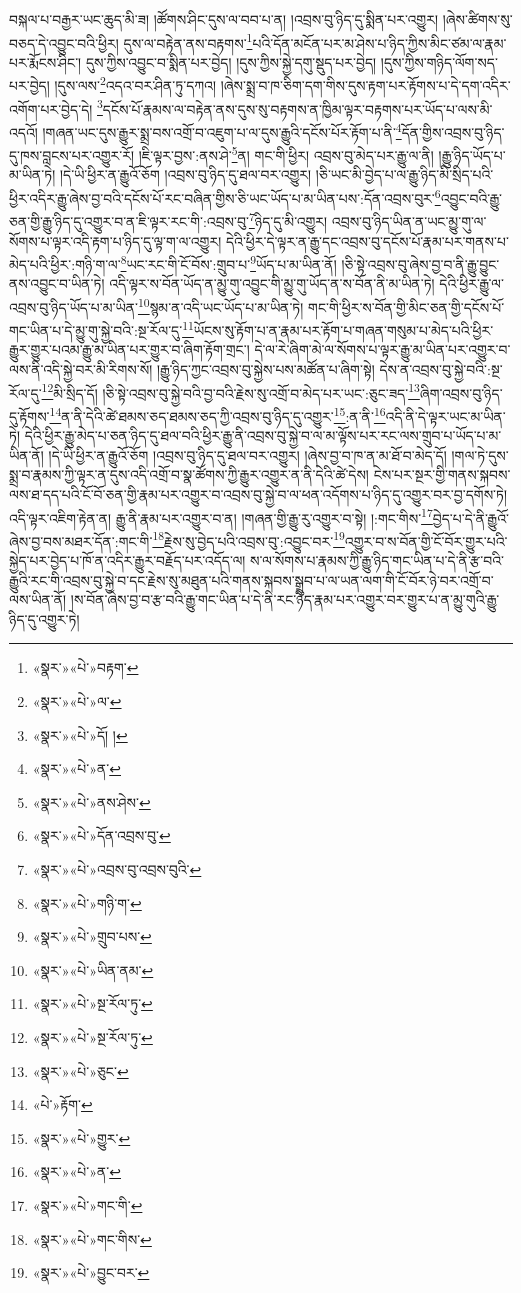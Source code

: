 བསྐལ་པ་བརྒྱར་ཡང་ཆུད་མི་ཟ། །ཚོགས་ཤིང་དུས་ལ་བབ་པ་ན། །འབྲས་བུ་ཉིད་དུ་སྨིན་པར་འགྱུར། །ཞེས་ཚིགས་སུ་བཅད་དེ་འབྱུང་བའི་ཕྱིར། དུས་ལ་བརྟེན་ནས་བརྟགས་\footnote{«སྣར་»«པེ་»བརྟག་}པའི་དོན་མངོན་པར་མ་ཤེས་པ་ཉིད་ཀྱིས་མིང་ཙམ་ལ་རྣམ་པར་རྨོངས་ཤིང་། དུས་ཀྱིས་འབྱུང་བ་སྨིན་པར་བྱེད། །དུས་ཀྱིས་སྐྱེ་དགུ་སྡུད་པར་བྱེད། །དུས་ཀྱིས་གཉིད་ལོག་སད་པར་བྱེད། །དུས་ལས་\footnote{«སྣར་»«པེ་»ལ་}འདའ་བར་ཤིན་ཏུ་དཀའ། །ཞེས་སྨྲ་བ་ཁ་ཅིག་དག་གིས་དུས་རྟག་པར་རྟོགས་པ་དེ་དག་འདིར་འགོག་པར་བྱེད་དེ། \footnote{«སྣར་»«པེ་»དོ། ། }དངོས་པོ་རྣམས་ལ་བརྟེན་ནས་དུས་སུ་བརྟགས་ན་ཁྱིམ་ལྟར་བརྟགས་པར་ཡོད་པ་ལས་མི་འདའོ། །གཞན་ཡང་དུས་རྒྱུར་སྨྲ་བས་འགྲོ་བ་འཇུག་པ་ལ་དུས་རྒྱུའི་དངོས་པོར་རྟོག་པ་ནི་\footnote{«སྣར་»«པེ་»ན་}དོན་གྱིས་འབྲས་བུ་ཉིད་དུ་ཁས་བླངས་པར་འགྱུར་རོ། །ཇི་ལྟར་བྱས་:ནས་ཤེ་\footnote{«སྣར་»«པེ་»ནས་ཤེས་}ན། གང་གི་ཕྱིར། འབྲས་བུ་མེད་པར་རྒྱུ་ལ་ནི། །རྒྱུ་ཉིད་ཡོད་པ་མ་ཡིན་ཏེ། །དེ་ཡི་ཕྱིར་ན་རྒྱུའོ་ཅོག །འབྲས་བུ་ཉིད་དུ་ཐལ་བར་འགྱུར། །ཅི་ཡང་མི་བྱེད་པ་ལ་རྒྱུ་ཉིད་མི་སྲིད་པའི་ཕྱིར་འདིར་རྒྱུ་ཞེས་བྱ་བའི་དངོས་པོ་རང་བཞིན་གྱིས་ཅི་ཡང་ཡོད་པ་མ་ཡིན་པས་:དོན་འབྲས་བུར་\footnote{«སྣར་»«པེ་»དོན་འབྲས་བུ་}འབྱུང་བའི་རྒྱུ་ཅན་གྱི་རྒྱུ་ཉིད་དུ་འགྱུར་བ་ན་ཇི་ལྟར་རང་གི་:འབྲས་བུ་\footnote{«སྣར་»«པེ་»འབྲས་བུ་འབྲས་བུའི་}ཉིད་དུ་མི་འགྱུར། འབྲས་བུ་ཉིད་ཡིན་ན་ཡང་མྱུ་གུ་ལ་སོགས་པ་ལྟར་འདི་རྟག་པ་ཉིད་དུ་ལྟ་ག་ལ་འགྱུར། དེའི་ཕྱིར་དེ་ལྟར་ན་རྒྱུ་དང་འབྲས་བུ་དངོས་པོ་རྣམ་པར་གནས་པ་མེད་པའི་ཕྱིར་:གཉི་ག་ལ་\footnote{«སྣར་»«པེ་»གཉི་ག་}ཡང་རང་གི་ངོ་བོས་:གྲུབ་པ་\footnote{«སྣར་»«པེ་»གྲུབ་པས་}ཡོད་པ་མ་ཡིན་ནོ། །ཅི་སྟེ་འབྲས་བུ་ཞེས་བྱ་བ་ནི་རྒྱུ་བྱུང་ནས་འབྱུང་བ་ཡིན་ཏེ། འདི་ལྟར་ས་བོན་ཡོད་ན་མྱུ་གུ་འབྱུང་གི་མྱུ་གུ་ཡོད་ན་ས་བོན་ནི་མ་ཡིན་ཏེ། དེའི་ཕྱིར་རྒྱུ་ལ་འབྲས་བུ་ཉིད་ཡོད་པ་མ་ཡིན་\footnote{«སྣར་»«པེ་»ཡིན་ནམ་}སྙམ་ན་འདི་ཡང་ཡོད་པ་མ་ཡིན་ཏེ། གང་གི་ཕྱིར་ས་བོན་གྱི་མིང་ཅན་གྱི་དངོས་པོ་གང་ཡིན་པ་དེ་མྱུ་གུ་སྐྱེ་བའི་:སྔ་རོལ་དུ་\footnote{«སྣར་»«པེ་»སྔ་རོལ་ཏུ་}ཡོངས་སུ་རྟོག་པ་ན་རྣམ་པར་རྟོག་པ་གཞན་གསུམ་པ་མེད་པའི་ཕྱིར་རྒྱུར་གྱུར་པའམ་རྒྱུ་མ་ཡིན་པར་གྱུར་བ་ཞིག་རྟོག་གྲང་། དེ་ལ་རེ་ཞིག་མེ་ལ་སོགས་པ་ལྟར་རྒྱུ་མ་ཡིན་པར་འགྱུར་བ་ལས་ནི་འདི་སྐྱེ་བར་མི་རིགས་སོ། །རྒྱུ་ཉིད་ཀྱང་འབྲས་བུ་སྐྱེས་པས་མཚོན་པ་ཞིག་སྟེ། དེས་ན་འབྲས་བུ་སྐྱེ་བའི་:སྔ་རོལ་དུ་\footnote{«སྣར་»«པེ་»སྔ་རོལ་ཏུ་}མི་སྲིད་དོ། །ཅི་སྟེ་འབྲས་བུ་སྐྱེ་བའི་བྱ་བའི་རྗེས་སུ་འགྲོ་བ་མེད་པར་ཡང་:ཅུང་ཟད་\footnote{«སྣར་»«པེ་»ཅུང་}ཞིག་འབྲས་བུ་ཉིད་དུ་རྟོགས་\footnote{«པེ་»རྟོག་}ན་ནི་དེའི་ཚེ་ཐམས་ཅད་ཐམས་ཅད་ཀྱི་འབྲས་བུ་ཉིད་དུ་འགྱུར་\footnote{«སྣར་»«པེ་»གྱུར་}:ན་ནི་\footnote{«སྣར་»«པེ་»ན་}འདི་ནི་དེ་ལྟར་ཡང་མ་ཡིན་ཏེ། དེའི་ཕྱིར་རྒྱུ་མེད་པ་ཅན་ཉིད་དུ་ཐལ་བའི་ཕྱིར་རྒྱུ་ནི་འབྲས་བུ་སྐྱེ་བ་ལ་མ་ལྟོས་པར་རང་ལས་གྲུབ་པ་ཡོད་པ་མ་ཡིན་ནོ། །དེ་ཡི་ཕྱིར་ན་རྒྱུའོ་ཅོག །འབྲས་བུ་ཉིད་དུ་ཐལ་བར་འགྱུར། །ཞེས་བྱ་བ་ཁ་ན་མ་ཐོ་བ་མེད་དོ། །གལ་ཏེ་དུས་སྨྲ་བ་རྣམས་ཀྱི་ལྟར་ན་དུས་འདི་འགྲོ་བ་སྣ་ཚོགས་ཀྱི་རྒྱུར་འགྱུར་ན་ནི་དེའི་ཚེ་དེས། ངེས་པར་སྔར་གྱི་གནས་སྐབས་ལས་ཐ་དད་པའི་ངོ་བོ་ཅན་གྱི་རྣམ་པར་འགྱུར་བ་འབྲས་བུ་སྐྱེ་བ་ལ་ཕན་འདོགས་པ་ཉིད་དུ་འགྱུར་བར་བྱ་དགོས་ཏེ། འདི་ལྟར་འཇིག་རྟེན་ན། རྒྱུ་ནི་རྣམ་པར་འགྱུར་བ་ན། །གཞན་གྱི་རྒྱུ་རུ་འགྱུར་བ་སྟེ། །:གང་གིས་\footnote{«སྣར་»«པེ་»གང་གི་}བྱེད་པ་དེ་ནི་རྒྱུའོ་ཞེས་བྱ་བས་མཐར་དོན་:གང་གི་\footnote{«སྣར་»«པེ་»གང་གིས་}རྗེས་སུ་བྱེད་པའི་འབྲས་བུ་:འབྱུང་བར་\footnote{«སྣར་»«པེ་»བྱུང་བར་}འགྱུར་བ་ས་བོན་གྱི་ངོ་བོར་གྱུར་པའི་སྐྱེད་པར་བྱེད་པ་ཁོ་ན་འདིར་རྒྱུར་བརྗོད་པར་འདོད་ལ། ས་ལ་སོགས་པ་རྣམས་ཀྱི་རྒྱུ་ཉིད་གང་ཡིན་པ་དེ་ནི་རྩ་བའི་རྒྱུའི་རང་གི་འབྲས་བུ་སྐྱེ་བ་དང་རྗེས་སུ་མཐུན་པའི་གནས་སྐབས་སྒྲུབ་པ་ལ་ཡན་ལག་གི་ངོ་བོར་ཉེ་བར་འགྲོ་བ་ལས་ཡིན་ནོ། །ས་བོན་ཞེས་བྱ་བ་རྩ་བའི་རྒྱུ་གང་ཡིན་པ་དེ་ནི་རང་ཉིད་རྣམ་པར་འགྱུར་བར་གྱུར་པ་ན་མྱུ་གུའི་རྒྱུ་ཉིད་དུ་འགྱུར་ཏེ། 